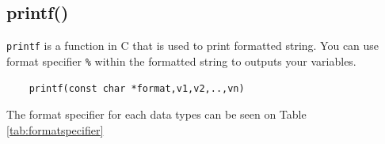 \subsection{printf()}
\verb*|printf| is a function in C that is used to print formatted string.  You can use format specifier \verb*|%| within the formatted string to outputs your variables.

\begin{verbatim}
	printf(const char *format,v1,v2,..,vn)
\end{verbatim}

The format specifier for each data types can be seen on Table \ref{tab:formatspecifier}


